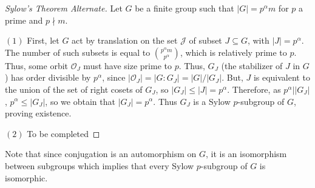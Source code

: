 \documentclass[12pt, a4paper, oneside, openright, titlepage]{book}
\begin{document}
\begin{proof}[Sylow's Theorem Alternate]
    Let $G$ be a finite group such that $|G| = p^{\alpha}m$ for $p$ a prime and $p\nmid m$. 

    $(1)$ First, let $G$ act by translation on the set $\mathcal{J}$ of subset $J \subseteq G$, with $|J| = p^{\alpha}$. The number of such subsets is equal to $\binom{p^{\alpha}m}{p^{\alpha}}$, which is relatively prime to $p$. Thus, some orbit $\mathcal{O}_J$ must have size prime to $p$. Thus, $G_J$ (the stabilizer of $J$ in $G$) has order divisible by $p^{\alpha}$, since $|\mathcal{O}_J| = |G:G_J| = |G|/|G_J|$. But, $J$ is equivalent to the union of the set of right cosets of $G_J$, so $|G_J|\leq |J| = p^{\alpha}$. Therefore, as $p^{\alpha}\vert|G_J|$, $p^{\alpha}\leq |G_J|$, so we obtain that $|G_J| = p^{\alpha}$. Thus $G_J$ is a Sylow $p$-subgroup of $G$, proving existence.


    $(2)$ To be completed 
\end{proof}

Note that since conjugation is an automorphism on $G$, it is an isomorphism between subgroups which implies that every Sylow $p$-subgroup of $G$ is isomorphic.
\end{document}
